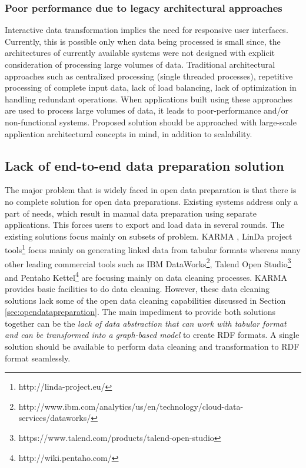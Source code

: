 \subsubsection{Poor performance due to legacy architectural approaches }
\noindent Interactive data transformation implies the need for responsive user interfaces. Currently, this is possible only when data being processed is small since, the architectures of currently available systems were not designed with explicit consideration of processing large volumes of data. Traditional architectural approaches such as centralized processing (single threaded processes),  repetitive processing of complete input data, lack of load balancing, lack of optimization in handling redundant operations. When applications built using these approaches are used to process large volumes of data, it leads to poor-performance and/or non-functional systems. Proposed solution should be approached with large-scale application architectural concepts in mind, in addition to scalability.

\subsection{Lack of end-to-end data preparation solution}
\noindent The major problem that is widely faced in open data preparation is that there is no complete solution for open data preparations. Existing systems address only a part of needs, which result in manual data preparation using separate applications. This forces users to export and load data in several rounds. The existing solutions focus mainly on subsets of problem. KARMA \cite{karma}, LinDa project tools\footnote{http://linda-project.eu/} focus mainly on generating linked data from tabular formats whereas many other leading commercial tools such as IBM DataWorks\footnote{http://www.ibm.com/analytics/us/en/technology/cloud-data-services/dataworks/}, Talend Open Studio\footnote{https://www.talend.com/products/talend-open-studio} and Pentaho Kettel\footnote{http://wiki.pentaho.com/} are focusing mainly on data cleaning processes. KARMA provides basic facilities to do data cleaning. However, these data cleaning solutions lack some of the open data cleaning capabilities discussed in Section \ref{sec:opendatapreparation}. The main impediment to provide both solutions together can be the \textit{ lack of data abstraction that can work with tabular format and can be transformed into a graph-based model} to create RDF formats. A single solution should be available to perform data cleaning and transformation to RDF format seamlessly. 
